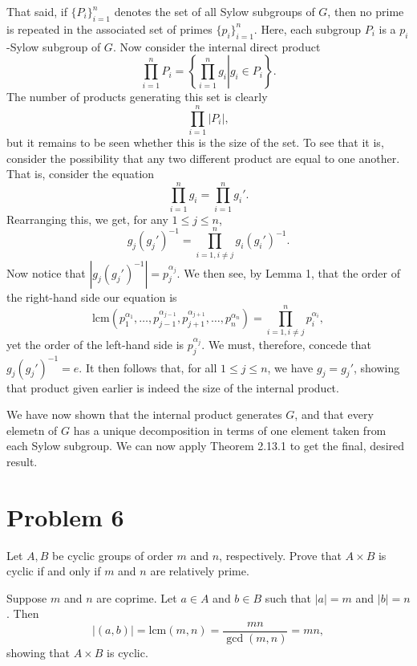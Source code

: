 \documentclass[12pt]{article}
\newcommand{\lcm}{\mbox{lcm}}
\begin{document}
That said, if $\{P_i\}_{i=1}^n$ denotes the set of all Sylow subgroups of $G$,
then no prime is repeated in the associated set of primes $\{p_i\}_{i=1}^n$.
Here, each subgroup $P_i$ is a $p_i$-Sylow subgroup of $G$.
Now consider the internal direct product
\begin{equation*}
\prod_{i=1}^n P_i = \left\{\left.\prod_{i=1}^n g_i\right|g_i\in P_i\right\}.
\end{equation*}
The number of products generating this set is clearly
\begin{equation*}
\prod_{i=1}^n |P_i|,
\end{equation*}
but it remains to be seen whether this is the size of the set.  To see that
it is, consider the possibility that any two different product are equal to one another.
That is, consider the equation
\begin{equation*}
\prod_{i=1}^n g_i = \prod_{i=1}^n g_i'.
\end{equation*}
Rearranging this, we get, for any $1\leq j\leq n$,
\begin{equation*}
g_j(g_j')^{-1} = \prod_{i=1,i\neq j}^n g_i(g_i')^{-1}.
\end{equation*}
Now notice that $|g_j(g_j')^{-1}|=p_j^{\alpha_j}$.  We then see, by Lemma 1, that the
order of the right-hand side our equation is
\begin{equation*}
\lcm(p_1^{\alpha_1},\dots,p_{j-1}^{\alpha_{j-1}},p_{j+1}^{\alpha_{j+1}},\dots,p_n^{\alpha_n}) = \prod_{i=1,i\neq j}^n p_i^{\alpha_i},
\end{equation*}
yet the order of the left-hand side is $p_j^{\alpha_j}$.  We must, therefore, concede that $g_j(g_j')^{-1}=e$.
It then follows that, for all $1\leq j\leq n$, we have $g_j=g_j'$, showing that product given earlier is indeed
the size of the internal product.

We have now shown that the internal product generates $G$, and that every elemetn of $G$ has a
unique decomposition in terms of one element taken from each Sylow subgroup.  We can now apply
Theorem 2.13.1 to get the final, desired result.

\section*{Problem 6}

Let $A,B$ be cyclic groups of order $m$ and $n$, respectively.  Prove that
$A\times B$ is cyclic if and only if $m$ and $n$ are relatively prime.

Suppose $m$ and $n$ are coprime.  Let $a\in A$ and $b\in B$ such that $|a|=m$ and $|b|=n$.
Then
\begin{equation*}
|(a,b)|=\lcm(m,n)=\frac{mn}{\gcd(m,n)}=mn,
\end{equation*}
showing that $A\times B$ is cyclic.
\end{document}

